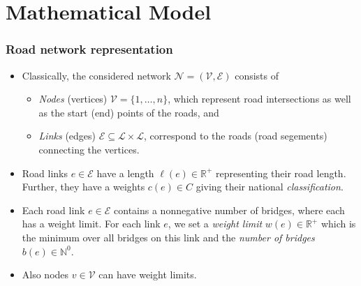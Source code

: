 \documentclass{beamer}   %
\theoremstyle{break}
\begin{document}
  \section[Mathematical Model]{Mathematical Model}
  \begin{frame}
    \frametitle{Road network representation}
    \begin{itemize}

      \item Classically,  the considered network $\mathcal{N}=(\mathcal{V},\mathcal{E})$ consists of
      \begin{itemize}
        \item \emph{Nodes} (vertices) $\mathcal{V}=\{1,\ldots, n\}$, which represent road  intersections as
        well as the start (end) points of the roads, and

        \item \emph{Links} (edges) $\mathcal{E} \subseteq \mathcal{L} \times \mathcal{L}$,
        correspond to the roads (road segements) connecting the vertices.
      \end{itemize}

      \item  Road links $e \in \mathcal{E}$ have a length $\ell(e)\in \mathbb{R}^{+}$ representing their road length.
      Further, they have a weights $c(e) \in C$ giving their national \emph{classification}.
      \item
      Each road link $e \in \mathcal{E}$ contains a nonnegative number of bridges, where each has a weight limit.
      For each link $e$, we set a \emph{weight limit} $w(e) \in \mathbb{R}^{+}$ which is the
      minimum over all bridges on this link and the \emph{number of bridges} $b(e) \in \mathbb{N}^{0}$.

      \item Also  nodes $v \in \mathcal{V}$ can have weight limits.
    \end{itemize}

  \end{frame}
\end{document}
